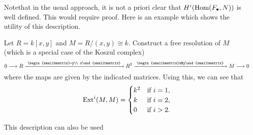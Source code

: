 Notethat in the usual approach, it is not a priori clear that
\(H^i(\operatorname{Hom}(F_\bullet,N))\) is well defined. This would require proof. Here
is an example which shows the utility of this description.

\begin{exercise}
  Let \(R=k[x,y]\) and \(M=R/(x,y)\cong k\). Construct a free resolution of
  \(M\) (which is a special case of the Koszul complex)
  \[
    0\To R\xright{\begin{smallbmatrix}-y\\ x\end{smallbmatrix}}
    R^2\xright{\begin{smallbmatrix}x&y\end{smallbmatrix}}
    M\To
    0
  \]
  where the maps are given by the indicated matrices. Using this, we can
  see that
  \[
    \operatorname{Ext}^i(M,M)=
    \begin{cases}
      k^2&\text{if \(i=1\),}\\
      k&\text{if \(i=2\),}\\
      0&\text{if \(i>2\).}
    \end{cases}
  \]
\end{exercise}

This description can also be used

